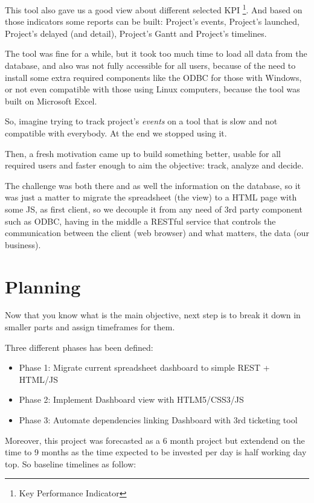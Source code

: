 \documentclass[a4paper,12pt,english]{book}
\begin{document}
This tool also gave us a good view about different selected KPI \footnote{Key
Performance Indicator}. And based on those indicators some reports can be
built:
Project's events, Project's launched, Project's delayed (and detail), Project's
Gantt and Project's timelines.

The tool was fine for a while, but it took too much time to load all data
from the database, and also was not fully accessible for all users, because
of the need to install some extra required components like the ODBC for those with
Windows, or not even compatible with those using Linux computers, because the
tool was built on Microsoft Excel.

So, imagine trying to track project's \emph{events} on a tool that is slow
and not compatible with everybody. At the end we stopped using it.

Then, a fresh motivation came up to build something better,
usable for all required users and faster enough to aim the objective: track,
analyze and decide. 

The challenge was both there and as well the information on the database, so it
was just a matter to migrate the spreadsheet (the view) to a HTML page with some JS,
as first client, so we decouple it from any need of 3rd party component such as
ODBC, having in the middle a RESTful service that
controls the communication between the client (web browser) and what matters,
the data (our business).

\chapter*{Planning}
Now that you know what is the main objective, next step is to break it down in
smaller parts and assign timeframes for them.

Three different phases has been defined:
\begin{itemize}
	\item Phase 1: Migrate current spreadsheet dashboard to simple REST +
	HTML/JS
	\item Phase 2: Implement Dashboard view with HTLM5/CSS3/JS
	\item Phase 3: Automate dependencies linking Dashboard with 3rd ticketing
	tool
\end{itemize}

Moreover, this project was forecasted as a 6 month project but extendend on
the time to 9 months as the time expected to be invested per day is half
working day top. So baseline timelines as follow: 
\end{document}
